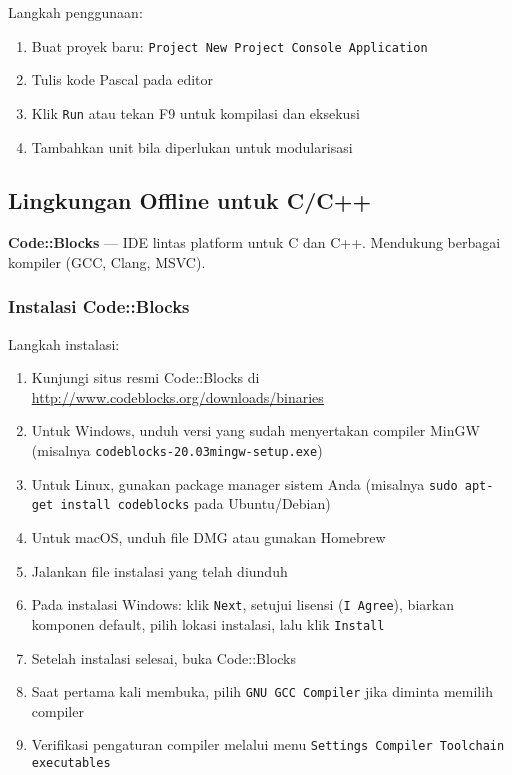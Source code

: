 \documentclass[../main.tex]{subfiles}
\begin{document}
Langkah penggunaan:
\begin{enumerate}
  \item Buat proyek baru: \texttt{Project \textrightarrow{} New Project \textrightarrow{} Console Application}
  \item Tulis kode Pascal pada editor
  \item Klik \texttt{Run} atau tekan F9 untuk kompilasi dan eksekusi
  \item Tambahkan unit bila diperlukan untuk modularisasi
\end{enumerate}

\subsection{Lingkungan Offline untuk C/C++}
\textbf{Code::Blocks} \parencite{codeblocks} — IDE lintas platform untuk C dan C++. Mendukung berbagai kompiler (GCC, Clang, MSVC).

\subsubsection{Instalasi Code::Blocks}
Langkah instalasi:
\begin{enumerate}
  \item Kunjungi situs resmi Code::Blocks di \url{http://www.codeblocks.org/downloads/binaries}
  \item Untuk Windows, unduh versi yang sudah menyertakan compiler MinGW (misalnya \texttt{codeblocks-20.03mingw-setup.exe})
  \item Untuk Linux, gunakan package manager sistem Anda (misalnya \texttt{sudo apt-get install codeblocks} pada Ubuntu/Debian)
  \item Untuk macOS, unduh file DMG atau gunakan Homebrew
  \item Jalankan file instalasi yang telah diunduh
  \item Pada instalasi Windows: klik \texttt{Next}, setujui lisensi (\texttt{I Agree}), biarkan komponen default, pilih lokasi instalasi, lalu klik \texttt{Install}
  \item Setelah instalasi selesai, buka Code::Blocks
  \item Saat pertama kali membuka, pilih \texttt{GNU GCC Compiler} jika diminta memilih compiler
  \item Verifikasi pengaturan compiler melalui menu \texttt{Settings \textrightarrow{} Compiler \textrightarrow{} Toolchain executables}
\end{enumerate}
\end{document}
